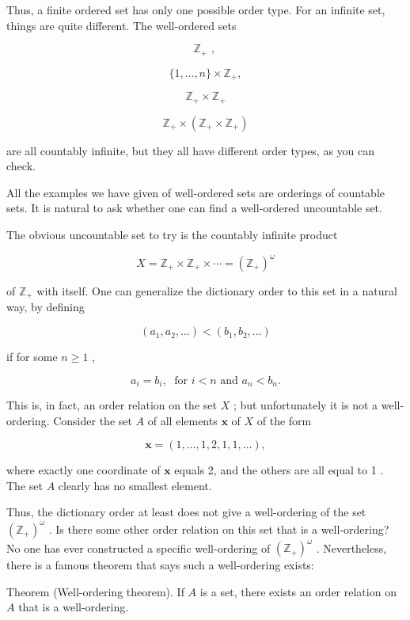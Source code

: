 Thus, a finite ordered set has only one possible order type. For an infinite set, things are quite different. The well-ordered sets

\[
{\mathbb{Z}}_{ + }\text{ , }
\]

\[
\{ 1,\ldots ,n\}  \times  {\mathbb{Z}}_{ + },
\]

\[
{\mathbb{Z}}_{ + } \times  {\mathbb{Z}}_{ + }
\]

\[
{\mathbb{Z}}_{ + } \times  \left( {{\mathbb{Z}}_{ + } \times  {\mathbb{Z}}_{ + }}\right)
\]

are all countably infinite, but they all have different order types, as you can check.

All the examples we have given of well-ordered sets are orderings of countable sets. It is natural to ask whether one can find a well-ordered uncountable set.

The obvious uncountable set to try is the countably infinite product

\[
X = {\mathbb{Z}}_{ + } \times  {\mathbb{Z}}_{ + } \times  \cdots  = {\left( {\mathbb{Z}}_{ + }\right) }^{\omega }
\]

of \({\mathbb{Z}}_{ + }\) with itself. One can generalize the dictionary order to this set in a natural way, by defining

\[
\left( {{a}_{1},{a}_{2},\ldots }\right)  < \left( {{b}_{1},{b}_{2},\ldots }\right)
\]

if for some \(n \geq  1\) ,

\[
{a}_{i} = {b}_{i},\;\text{ for }i < n\text{ and }{a}_{n} < {b}_{n}.
\]

This is, in fact, an order relation on the set \(X\) ; but unfortunately it is not a well-ordering. Consider the set \(A\) of all elements \(\mathbf{x}\) of \(X\) of the form

\[
\mathbf{x} = \left( {1,\ldots ,1,2,1,1,\ldots }\right) ,
\]

where exactly one coordinate of \(\mathbf{x}\) equals 2, and the others are all equal to 1 . The set \(A\) clearly has no smallest element.

Thus, the dictionary order at least does not give a well-ordering of the set \({\left( {\mathbb{Z}}_{ + }\right) }^{\omega }\) . Is there some other order relation on this set that is a well-ordering? No one has ever constructed a specific well-ordering of \({\left( {\mathbb{Z}}_{ + }\right) }^{\omega }\) . Nevertheless, there is a famous theorem that says such a well-ordering exists:

Theorem (Well-ordering theorem). If \(A\) is a set, there exists an order relation on \(A\) that is a well-ordering.

